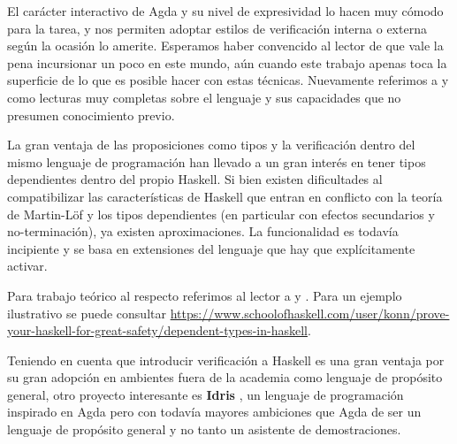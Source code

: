\documentclass[11pt]{article} %
\begin{document}
El carácter interactivo de Agda y su nivel de expresividad lo hacen muy cómodo para la tarea, y nos permiten adoptar estilos de verificación interna o externa según la ocasión lo amerite. Esperamos haber convencido al lector de que vale la pena incursionar un poco en este mundo, aún cuando este trabajo apenas toca la superficie de lo que es posible hacer con estas técnicas. Nuevamente referimos a \cite{Stump16} y \cite{plfa2019} como lecturas muy completas sobre el lenguaje y sus capacidades que no presumen conocimiento previo.

La gran ventaja de las proposiciones como tipos y la verificación dentro del mismo lenguaje de programación han llevado a un gran interés en tener tipos dependientes dentro del propio Haskell. Si bien existen dificultades al compatibilizar las características de Haskell que entran en conflicto con la teoría de Martin-Löf y los tipos dependientes (en particular con efectos secundarios y no-terminación), ya existen aproximaciones. La funcionalidad es todavía incipiente y se basa en extensiones del lenguaje que hay que explícitamente activar. 

Para trabajo teórico al respecto referimos al lector a \cite{mcbride2002faking} y \cite{lindley2014hasochism}. Para un ejemplo ilustrativo se puede consultar \url{https://www.schoolofhaskell.com/user/konn/prove-your-haskell-for-great-safety/dependent-types-in-haskell}. 

Teniendo en cuenta que introducir verificación a Haskell es una gran ventaja por su gran adopción en ambientes fuera de la academia como lenguaje de propósito general, otro proyecto interesante es \textbf{Idris} \cite{brady2013idris}, un lenguaje de programación inspirado en Agda pero con todavía mayores ambiciones que Agda de ser un lenguaje de propósito general y no tanto un asistente de demostraciones.

{}

\end{document}
